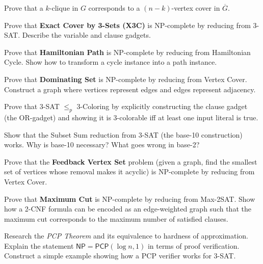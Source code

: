 \begin{exercise}[Basic]
Prove that a $k$-clique in $G$ corresponds to a $(n-k)$-vertex cover in $\overline{G}$.
\end{exercise}

\begin{exercise}[Intermediate]
Prove that \textbf{Exact Cover by 3-Sets (X3C)} is NP-complete by reducing from 3-SAT. Describe the variable and clause gadgets.
\end{exercise}

\begin{exercise}[Intermediate]
Prove that \textbf{Hamiltonian Path} is NP-complete by reducing from Hamiltonian Cycle. Show how to transform a cycle instance into a path instance.
\end{exercise}

\begin{exercise}[Intermediate]
Prove that \textbf{Dominating Set} is NP-complete by reducing from Vertex Cover. Construct a graph where vertices represent edges and edges represent adjacency.
\end{exercise}

\begin{exercise}[Intermediate]
Prove that 3-SAT $\le_p$ 3-Coloring by explicitly constructing the clause gadget (the OR-gadget) and showing it is 3-colorable iff at least one input literal is true.
\end{exercise}

\begin{exercise}[Intermediate]
Show that the Subset Sum reduction from 3-SAT (the base-10 construction) works. Why is base-10 necessary? What goes wrong in base-2?
\end{exercise}

\begin{exercise}[Intermediate]
Prove that the \textbf{Feedback Vertex Set} problem (given a graph, find the smallest set of vertices whose removal makes it acyclic) is NP-complete by reducing from Vertex Cover.
\end{exercise}

\begin{exercise}[Intermediate]
Prove that \textbf{Maximum Cut} is NP-complete by reducing from Max-2SAT. Show how a 2-CNF formula can be encoded as an edge-weighted graph such that the maximum cut corresponds to the maximum number of satisfied clauses.
\end{exercise}

\begin{exercise}[Challenge]
Research the \emph{PCP Theorem} and its equivalence to hardness of approximation. Explain the statement $\mathsf{NP} = \mathsf{PCP}(\log n, 1)$ in terms of proof verification. Construct a simple example showing how a PCP verifier works for 3-SAT.
\end{exercise}

